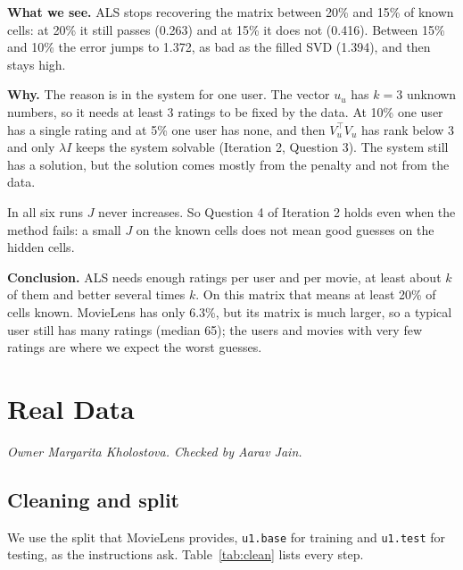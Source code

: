 \textbf{What we see.} ALS stops recovering the matrix between 20\% and 15\% of known cells: at 20\% it still passes (0.263) and at 15\% it does not (0.416). Between 15\% and 10\% the error jumps to 1.372, as bad as the filled SVD (1.394), and then stays high.

\textbf{Why.} The reason is in the system for one user. The vector $u_u$ has $k = 3$ unknown numbers, so it needs at least 3 ratings to be fixed by the data. At 10\% one user has a single rating and at 5\% one user has none, and then $V_u^\top V_u$ has rank below 3 and only $\lambda I$ keeps the system solvable (Iteration 2, Question 3). The system still has a solution, but the solution comes mostly from the penalty and not from the data.

In all six runs $J$ never increases. So Question 4 of Iteration 2 holds even when the method fails: a small $J$ on the known cells does not mean good guesses on the hidden cells.

\textbf{Conclusion.} ALS needs enough ratings per user and per movie, at least about $k$ of them and better several times $k$. On this matrix that means at least 20\% of cells known. MovieLens has only 6.3\%, but its matrix is much larger, so a typical user still has many ratings (median 65); the users and movies with very few ratings are where we expect the worst guesses.

\section{Real Data}
\textit{Owner Margarita Kholostova. Checked by Aarav Jain.}


\subsection{Cleaning and split}

We use the split that MovieLens provides, \texttt{u1.base} for training and \texttt{u1.test} for testing, as the instructions ask. Table~\ref{tab:clean} lists every step.

